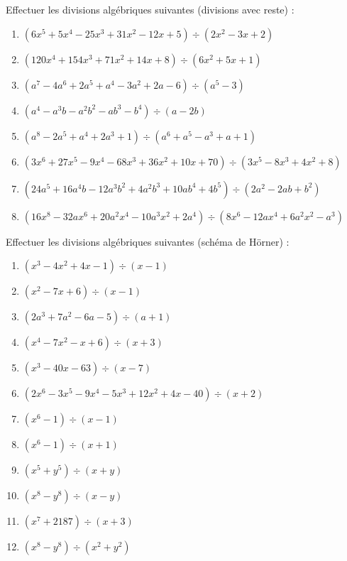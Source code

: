 \begin{exercice}
Effectuer les divisions algébriques suivantes (divisions avec reste) :
\begin{multicols}{2}
\begin{enumerate}
\item $(6{{x}^{5}}+5{{x}^{4}}-25{{x}^{3}}+31{{x}^{2}}-12x+5)\div (2{{x}^{2}}-3x+2)$
\item $(120{{x}^{4}}+154{{x}^{3}}+71{{x}^{2}}+14x+8)\div (6{{x}^{2}}+5x+1)$
\item $({{a}^{7}}-4{{a}^{6}}+2{{a}^{5}}+{{a}^{4}}-3{{a}^{2}}+2a-6)\div ({{a}^{5}}-3)$
\item $({{a}^{4}}-{{a}^{3}}b-{{a}^{2}}{{b}^{2}}-a{{b}^{3}}-{{b}^{4}})\div (a-2b)$
\item $({{a}^{8}}-2{{a}^{5}}+{{a}^{4}}+2{{a}^{3}}+1)\div ({{a}^{6}}+{{a}^{5}}-{{a}^{3}}+a+1)$
\item $(3{{x}^{6}}+27{{x}^{5}}-9{{x}^{4}}-68{{x}^{3}}+36{{x}^{2}}+10x+70)\div (3{{x}^{5}}-8{{x}^{3}}+4{{x}^{2}}+8)$
\item $(24{{a}^{5}}+16{{a}^{4}}b-12{{a}^{3}}{{b}^{2}}+4{{a}^{2}}{{b}^{3}}+10a{{b}^{4}}+4{{b}^{5}})\div (2{{a}^{2}}-2ab+{{b}^{2}})$
\item $(16{{x}^{8}}-32a{{x}^{6}}+20{{a}^{2}}{{x}^{4}}-10{{a}^{3}}{{x}^{2}}+2{{a}^{4}})\div (8{{x}^{6}}-12a{{x}^{4}}+6{{a}^{2}}{{x}^{2}}-{{a}^{3}})$
\end{enumerate}
\end{multicols}
\end{exercice}

\begin{exercice}
Effectuer les divisions algébriques suivantes (schéma de Hörner) :
\begin{multicols}{2}
\begin{enumerate}
\item $({{x}^{3}}-4{{x}^{2}}+4x-1)\div (x-1)$
\item $({{x}^{2}}-7x+6)\div (x-1)$
\item $(2{{a}^{3}}+7{{a}^{2}}-6a-5)\div (a+1)$
\item $({{x}^{4}}-7{{x}^{2}}-x+6)\div (x+3)$
\item $({{x}^{3}}-40x-63)\div (x-7)$
\item $(2{{x}^{6}}-3{{x}^{5}}-9{{x}^{4}}-5{{x}^{3}}+12{{x}^{2}}+4x-40)\div (x+2)$
\item $({{x}^{6}}-1)\div (x-1)$
\item $({{x}^{6}}-1)\div (x+1)$
\item $({{x}^{5}}+{{y}^{5}})\div (x+y)$
\item $({{x}^{8}}-{{y}^{8}})\div (x-y)$
\item $({{x}^{7}}+2187)\div (x+3)$
\item $({{x}^{8}}-{{y}^{8}})\div ({{x}^{2}}+{{y}^{2}})$
\end{enumerate}
\end{multicols}
\end{exercice}

